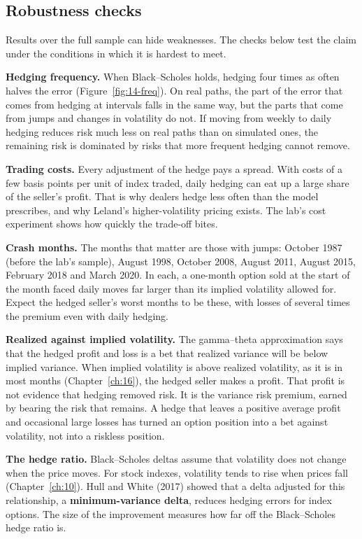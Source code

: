 \subsection{Robustness checks}
\label{sec:14-stress}

Results over the full sample can hide weaknesses. The checks below test the claim under the conditions in which it is hardest to meet.

\textbf{Hedging frequency.} When Black--Scholes holds, hedging four times as often halves the error (Figure~\ref{fig:14-freq}). On real paths, the part of the error that comes from hedging at intervals falls in the same way, but the parts that come from jumps and changes in volatility do not. If moving from weekly to daily hedging reduces risk much less on real paths than on simulated ones, the remaining risk is dominated by risks that more frequent hedging cannot remove.

\textbf{Trading costs.} Every adjustment of the hedge pays a spread. With costs of a few basis points per unit of index traded, daily hedging can eat up a large share of the seller's profit. That is why dealers hedge less often than the model prescribes, and why Leland's higher-volatility pricing exists. The lab's cost experiment shows how quickly the trade-off bites.

\textbf{Crash months.} The months that matter are those with jumps: October 1987 (before the lab's sample), August 1998, October 2008, August 2011, August 2015, February 2018 and March 2020. In each, a one-month option sold at the start of the month faced daily moves far larger than its implied volatility allowed for. Expect the hedged seller's worst months to be these, with losses of several times the premium even with daily hedging.

\textbf{Realized against implied volatility.} The gamma--theta approximation says that the hedged profit and loss is a bet that realized variance will be below implied variance. When implied volatility is above realized volatility, as it is in most months (Chapter~\ref{ch:16}), the hedged seller makes a profit. That profit is not evidence that hedging removed risk. It is the variance risk premium, earned by bearing the risk that remains. A hedge that leaves a positive average profit and occasional large losses has turned an option position into a bet against volatility, not into a riskless position.

\textbf{The hedge ratio.} Black--Scholes deltas assume that volatility does not change when the price moves. For stock indexes, volatility tends to rise when prices fall (Chapter~\ref{ch:10}). Hull and White (2017) showed that a delta adjusted for this relationship, a \textbf{minimum-variance delta}, reduces hedging errors for index options. The size of the improvement measures how far off the Black--Scholes hedge ratio is.

